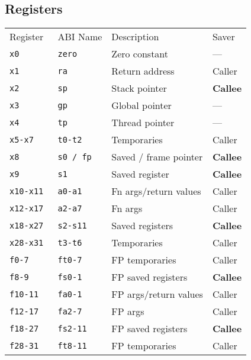 \subsection{Registers}
\renewcommand{\arraystretch}{1.2}
\setlength\tabcolsep{6pt} %
\begin{tabularx}{\linewidth}{@{}llll@{}}
    Register     & ABI Name     & Description           & Saver  \\
    \cmidrule{1-4}
    \tt{x0}      & \tt{zero}    & Zero constant         & ---    \\
    \tt{x1}      & \tt{ra}      & Return address        & Caller \\
    \tt{x2}      & \tt{sp}      & Stack pointer         & \textbf{Callee} \\
    \tt{x3}      & \tt{gp}      & Global pointer        & ---    \\
    \tt{x4}      & \tt{tp}      & Thread pointer        & ---    \\
    \tt{x5-x7}   & \tt{t0-t2}   & Temporaries           & Caller \\
    \tt{x8}      & \tt{s0 / fp} & Saved / frame pointer & \textbf{Callee} \\
    \tt{x9}      & \tt{s1}      & Saved register        & \textbf{Callee} \\
    \tt{x10-x11} & \tt{a0-a1}   & Fn args/return values & Caller \\
    \tt{x12-x17} & \tt{a2-a7}   & Fn args               & Caller \\
    \tt{x18-x27} & \tt{s2-s11}  & Saved registers       & \textbf{Callee} \\
    \tt{x28-x31} & \tt{t3-t6}   & Temporaries           & Caller \\
    \cmidrule{1-4}
    \tt{f0-7}    & \tt{ft0-7}   & FP temporaries        & Caller \\
    \tt{f8-9}    & \tt{fs0-1}   & FP saved registers    & \textbf{Callee} \\
    \tt{f10-11}  & \tt{fa0-1}   & FP args/return values & Caller \\
    \tt{f12-17}  & \tt{fa2-7}   & FP args               & Caller \\
    \tt{f18-27}  & \tt{fs2-11}  & FP saved registers    & \textbf{Callee} \\
    \tt{f28-31}  & \tt{ft8-11}  & FP temporaries        & Caller \\
\end{tabularx}
\renewcommand{\arraystretch}{1}
\setlength\tabcolsep{6pt} %